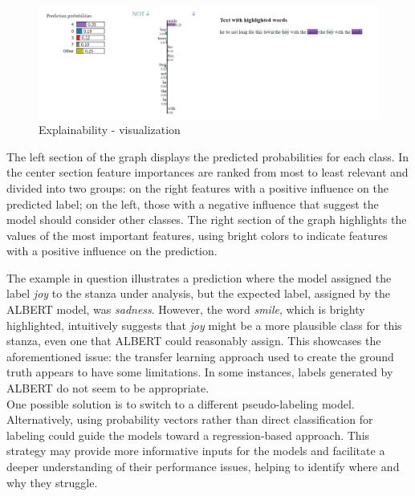 \begin{figure}[H]
    \centering
    \includegraphics[scale= 0.55]{pictures/expl.png}
    \caption{Explainability - visualization}
    \label{fig:expl}
\end{figure}

The left section of the graph displays the
predicted probabilities for each class. In the center section
feature importances are ranked from most to least relevant and divided into two
groups: on the right
features with a positive influence on the predicted label; on the left, those
with a negative influence that suggest the model should consider other classes.
The right section of the graph highlights the values of the most important
features, using bright colors to indicate features with a positive influence on the
prediction.

The example in question illustrates a prediction where the model assigned the label \textit{joy} to the stanza under analysis, but the expected label, assigned by the ALBERT model, was \textit{sadness}.
However, the word \textit{smile}, which is brighty highlighted, intuitively suggests that \textit{joy} might be a more plausible class for this stanza, even one that ALBERT could reasonably assign. 
This showcases the aforementioned issue: the transfer learning approach used to
create the ground truth appears to have some limitations. In some instances, labels
generated by ALBERT do not seem to be appropriate.\\


One possible solution is to switch to a different pseudo-labeling model.
Alternatively, using probability vectors rather than direct classification for
labeling could guide the models toward a regression-based approach. This strategy
may provide more informative inputs for the models and facilitate a deeper
understanding of their performance issues, helping to identify where and why they
struggle.

